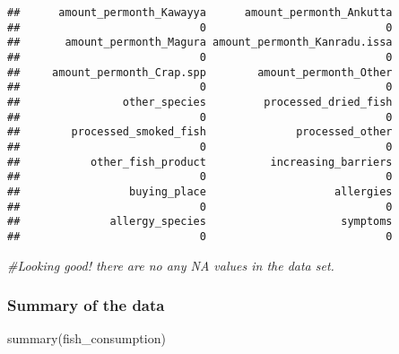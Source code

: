 \documentclass[
]{article}
\newenvironment{Shaded}{\begin{snugshade}}{\end{snugshade}}
\newcommand{\CommentTok}[1]{\textcolor[rgb]{0.56,0.35,0.01}{\textit{#1}}}
\newcommand{\FunctionTok}[1]{\textcolor[rgb]{0.00,0.00,0.00}{#1}}
\newcommand{\NormalTok}[1]{#1}
\begin{document}
\begin{verbatim}
##      amount_permonth_Kawayya      amount_permonth_Ankutta 
##                            0                            0 
##       amount_permonth_Magura amount_permonth_Kanradu.issa 
##                            0                            0 
##     amount_permonth_Crap.spp        amount_permonth_Other 
##                            0                            0 
##                other_species         processed_dried_fish 
##                            0                            0 
##        processed_smoked_fish              processed_other 
##                            0                            0 
##           other_fish_product          increasing_barriers 
##                            0                            0 
##                 buying_place                    allergies 
##                            0                            0 
##              allergy_species                     symptoms 
##                            0                            0
\end{verbatim}

\begin{Shaded}
\begin{Highlighting}[]
\CommentTok{\#Looking good! there are no any NA values in the data set. }
\end{Highlighting}
\end{Shaded}

\hypertarget{summary-of-the-data}{%
\subsubsection{Summary of the data}\label{summary-of-the-data}}

\begin{Shaded}
\begin{Highlighting}[]
\FunctionTok{summary}\NormalTok{(fish\_consumption)}
\end{Highlighting}
\end{Shaded}
\end{document}
